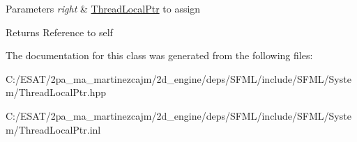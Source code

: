 \begin{DoxyParams}{Parameters}
{\em right} & \hyperlink{classsf_1_1_thread_local_ptr}{Thread\+Local\+Ptr} to assign\\
\hline
\end{DoxyParams}
\begin{DoxyReturn}{Returns}
Reference to self 
\end{DoxyReturn}


The documentation for this class was generated from the following files\+:\begin{DoxyCompactItemize}
\item 
C\+:/\+E\+S\+A\+T/2pa\+\_\+ma\+\_\+martinezcajm/2d\+\_\+engine/deps/\+S\+F\+M\+L/include/\+S\+F\+M\+L/\+System/Thread\+Local\+Ptr.\+hpp\item 
C\+:/\+E\+S\+A\+T/2pa\+\_\+ma\+\_\+martinezcajm/2d\+\_\+engine/deps/\+S\+F\+M\+L/include/\+S\+F\+M\+L/\+System/Thread\+Local\+Ptr.\+inl\end{DoxyCompactItemize}
